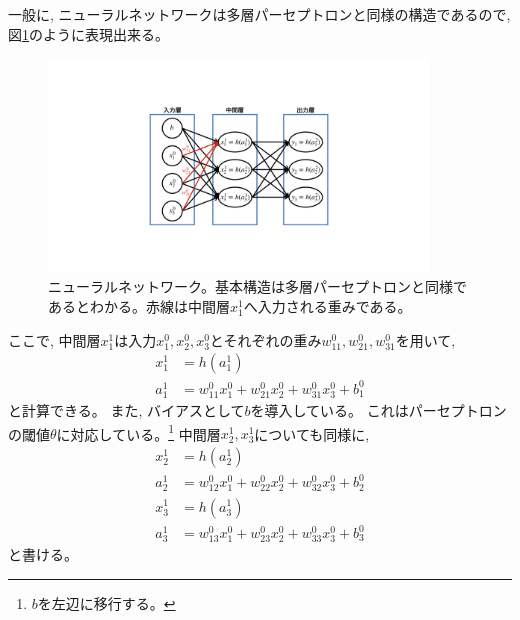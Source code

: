 一般に, ニューラルネットワークは多層パーセプトロンと同様の構造であるので, 図\ref{6NeuralNetwork}のように表現出来る。

\begin{figure}[htbp]
 \centering
 \includegraphics[trim = 250 200 250 200, width=0.9\textwidth, clip]{Figure/2DeepLearning/6NeuralNetwork.png}
 \caption[ニューラルネットワーク]{ニューラルネットワーク。基本構造は多層パーセプトロンと同様であるとわかる。赤線は中間層$x^1_1$へ入力される重みである。}
 \label{6NeuralNetwork}
\end{figure}

ここで, 中間層$x^1_1$は入力$x^0_1,x^0_2,x^0_3$とそれぞれの重み$w^0_{11},w^0_{21},w^0_{31}$を用いて, 
\begin{equation}
 \begin{split}
  x^1_1 &= h(a^1_1)\\
  a^1_1 &= w^0_{11}x^0_1 + w^0_{21}x^0_2 + w^0_{31}x^0_3 + b^0_1
 \end{split}
\end{equation}
と計算できる。
また, バイアスとして$b$を導入している。
これはパーセプトロンの閾値$\theta$に対応している。\footnote{$b$を左辺に移行する。}
中間層$x^1_2,x^1_3$についても同様に, 
\begin{equation}
 \begin{split}
  x^1_2 &= h(a^1_2)\\
  a^1_2 &= w^0_{12}x^0_1 + w^0_{22}x^0_2 + w^0_{32}x^0_3 + b^0_2\\
  x^1_3 &= h(a^1_3)\\
  a^1_3 &= w^0_{13}x^0_1 + w^0_{23}x^0_2 + w^0_{33}x^0_3 + b^0_3
 \end{split}
\end{equation}
と書ける。

